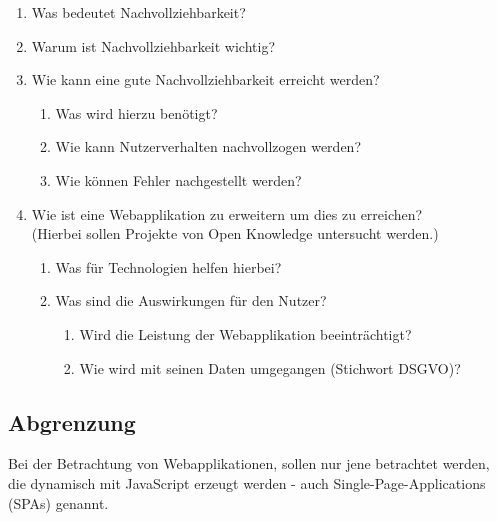 
\begin{enumerate}
	\item Was bedeutet Nachvollziehbarkeit?
	\item Warum ist Nachvollziehbarkeit wichtig?
	\item Wie kann eine gute Nachvollziehbarkeit erreicht werden?
	\begin{enumerate}
		\item Was wird hierzu benötigt?
		\item Wie kann Nutzerverhalten nachvollzogen werden?
		\item Wie können Fehler nachgestellt werden?
	\end{enumerate}
	\item Wie ist eine Webapplikation zu erweitern um dies zu erreichen? \\ (Hierbei sollen Projekte von Open Knowledge untersucht werden.)
	\begin{enumerate}
		\item Was für Technologien helfen hierbei?
		\item Was sind die Auswirkungen für den Nutzer?
		\begin{enumerate}
			\item Wird die Leistung der Webapplikation beeinträchtigt?
			\item Wie wird mit seinen Daten umgegangen (Stichwort DSGVO)?
		\end{enumerate}
	\end{enumerate}
\end{enumerate}


\subsection{Abgrenzung}


Bei der Betrachtung von Webapplikationen, sollen nur jene betrachtet werden, die dynamisch mit JavaScript erzeugt werden - auch Single-Page-Applications (SPAs) genannt.

